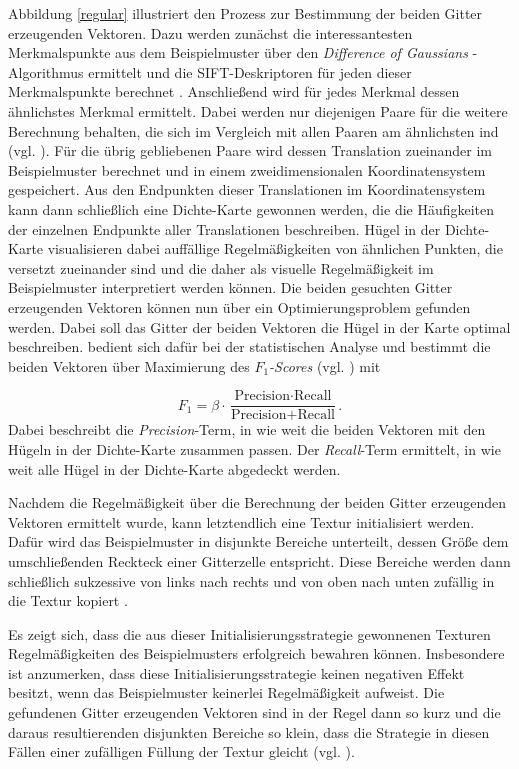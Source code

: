 Abbildung \ref{regular} illustriert den Prozess zur Bestimmung der beiden Gitter erzeugenden Vektoren.
Dazu werden zunächst die interessantesten Merkmalspunkte aus dem Beispielmuster über den \emph{\glqq Difference of Gaussians\grqq} -Algorithmus ermittelt und die SIFT-Deskriptoren für jeden dieser Merkmalspunkte berechnet \cite{SelfTuning}.
Anschließend wird für jedes Merkmal dessen ähnlichstes Merkmal ermittelt.
Dabei werden nur diejenigen Paare für die weitere Berechnung behalten, die sich im Vergleich mit allen Paaren am ähnlichsten ind (vgl. \cite{SelfTuning}).
Für die übrig gebliebenen Paare wird dessen Translation zueinander im Beispielmuster berechnet und in einem zweidimensionalen Koordinatensystem gespeichert.
Aus den Endpunkten dieser Translationen im Koordinatensystem kann dann schließlich eine Dichte-Karte gewonnen werden, die die Häufigkeiten der einzelnen Endpunkte aller Translationen beschreiben.
Hügel in der Dichte-Karte visualisieren dabei auffällige Regelmäßigkeiten von ähnlichen Punkten, die versetzt zueinander sind und die daher als visuelle Regelmäßigkeit im Beispielmuster interpretiert werden können.
Die beiden gesuchten Gitter erzeugenden Vektoren können nun über ein Optimierungsproblem gefunden werden.
Dabei soll das Gitter der beiden Vektoren die Hügel in der Karte optimal beschreiben.
\cite{SelfTuning} bedient sich dafür bei der statistischen Analyse und bestimmt die beiden Vektoren über Maximierung des \emph{\glqq $F_1$-Scores\grqq} (vgl. \cite{F1Score, SelfTuning}) mit

\begin{equation*}
	F_1 = \beta \cdot \frac{\text{Precision} \cdot \text{Recall}}{\text{Precision} + \text{Recall}}\text{.}
\end{equation*}
Dabei beschreibt die \emph{Precision}-Term, in wie weit die beiden Vektoren mit den Hügeln in der Dichte-Karte zusammen passen.
Der \emph{Recall}-Term ermittelt, in wie weit alle Hügel in der Dichte-Karte abgedeckt werden.

Nachdem die Regelmäßigkeit über die Berechnung der beiden Gitter erzeugenden Vektoren ermittelt wurde, kann letztendlich eine Textur initialisiert werden.
Dafür wird das Beispielmuster in disjunkte Bereiche unterteilt, dessen Größe dem umschließenden Reckteck einer Gitterzelle entspricht.
Diese Bereiche werden dann schließlich sukzessive von links nach rechts und von oben nach unten zufällig in die Textur kopiert \cite{SelfTuning}.

Es zeigt sich, dass die aus dieser Initialisierungsstrategie gewonnenen Texturen Regelmäßigkeiten des Beispielmusters erfolgreich bewahren können.
Insbesondere ist anzumerken, dass diese Initialisierungsstrategie keinen negativen Effekt besitzt, wenn das Beispielmuster keinerlei Regelmäßigkeit aufweist.
Die gefundenen Gitter erzeugenden Vektoren sind in der Regel dann so kurz und die daraus resultierenden disjunkten Bereiche so klein, dass die Strategie in diesen Fällen einer zufälligen Füllung der Textur gleicht (vgl. \cite{SelfTuning}).


